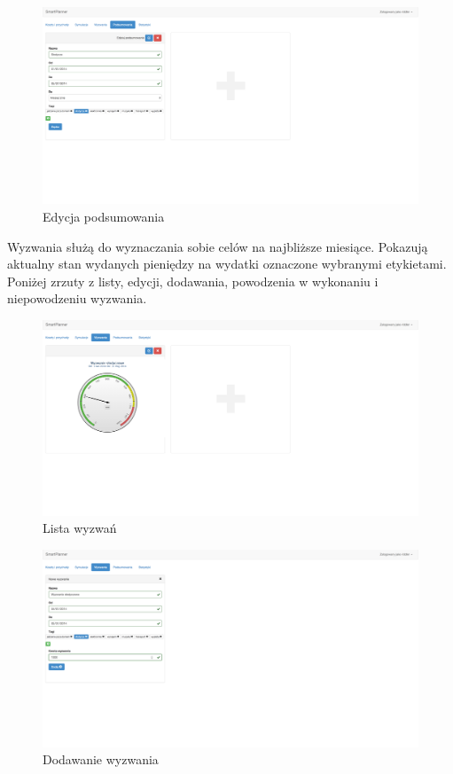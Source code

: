 \documentclass[10pt,titlepage]{article}
\begin{document}
\begin{figure}[H]
  \centering
  \includegraphics[scale=0.2]{images/screen_podsumowaniaEdycja.png}
  \caption{Edycja podsumowania}
  \label{screen:editSummary}
\end{figure}
\par Wyzwania służą do wyznaczania sobie celów na najbliższe miesiące. Pokazują aktualny stan wydanych pieniędzy na wydatki oznaczone wybranymi etykietami. Poniżej zrzuty z listy, edycji, dodawania, powodzenia w wykonaniu i niepowodzeniu wyzwania.
\begin{figure}[H]
  \centering
  \includegraphics[scale=0.2]{images/screen_wyzwania.png}
  \caption{Lista wyzwań}
\end{figure}
\begin{figure}[H]
  \centering
  \includegraphics[scale=0.2]{images/screen_wyzwaniaDodaj.png}
  \caption{Dodawanie wyzwania}
\end{figure}
\end{document}
